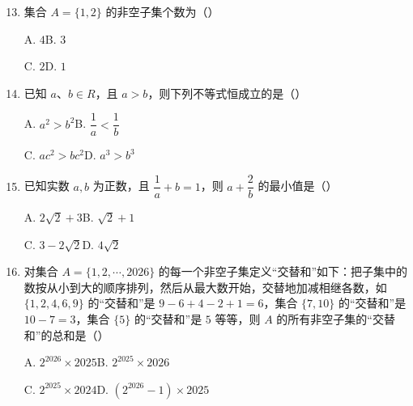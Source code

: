\documentclass[a4paper,11pt]{article}
\begin{document}
\begin{enumerate}
\setcounter{enumi}{12}

\item 集合 $A=\{1,2\}$ 的非空子集个数为\mbox{（\quad）}

\keepwithprev
A. $4$\qquad B. $3$

C. $2$\qquad D. $1$

\ifanswer
\solbegin
{}
\solend
\fi

\item 已知 $a$、$b\in R$，且 $a>b$，则下列不等式恒成立的是\mbox{（\quad）}

\keepwithprev
A. $a^2>b^2$\qquad B. $\dfrac1a<\dfrac1b$

C. $ac^2>bc^2$\qquad D. $a^3>b^3$

\ifanswer
{}
\fi

\item 已知实数 $a,b$ 为正数，且 $\dfrac1a+b=1$，则 $a+\dfrac2b$ 的最小值是\mbox{（\quad）}

\keepwithprev
A. $2\sqrt2+3$\qquad B. $\sqrt2+1$

C. $3-2\sqrt2$\qquad D. $4\sqrt2$

\ifanswer
\solbegin
{}
\solend
\fi

\item 对集合 $A=\{1,2,\cdots,2026\}$ 的每一个非空子集定义“交替和”如下：把子集中的数按从小到大的顺序排列，然后从最大数开始，交替地加减相继各数，如 $\{1,2,4,6,9\}$ 的“交替和”是 $9-6+4-2+1=6$，集合 $\{7,10\}$ 的“交替和”是 $10-7=3$，集合 $\{5\}$ 的“交替和”是 $5$ 等等，则 $A$ 的所有非空子集的“交替和”的总和是\mbox{（\quad）}

\keepwithprev
A. $2^{2026}\times2025$\qquad B. $2^{2025}\times2026$

C. $2^{2025}\times2024$\qquad D. $(2^{2026}-1)\times2025$


\end{enumerate}
\end{document}
